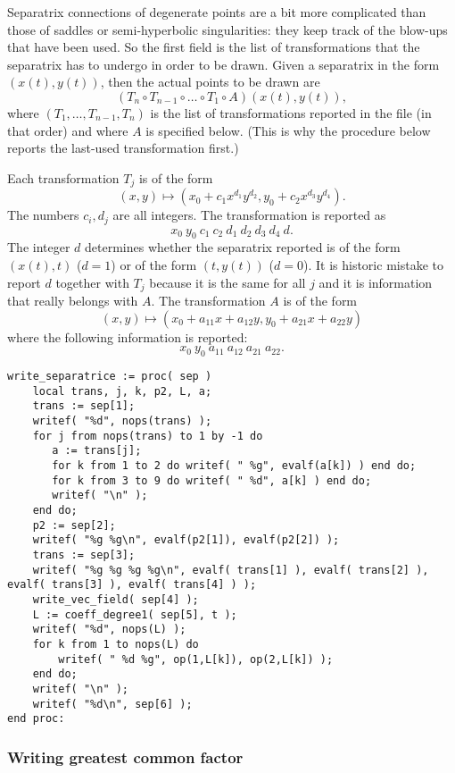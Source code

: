 \documentclass[a4paper,10pt]{article}
\begin{document}
Separatrix connections of degenerate points are a bit more complicated than those of saddles or semi-hyperbolic singularities: they keep track of the blow-ups that have been used.
So the first field is the list of transformations that the separatrix has to undergo in order to be drawn.  Given a separatrix in the form $(x(t),y(t))$, then the actual points to be drawn are
\[
    (T_{n}\circ T_{n-1}\circ\dots\circ T_1\circ A) (x(t),y(t)),
\]
where $(T_1,\dots,T_{n-1},T_n)$ is the list of transformations reported in the file (in that order) and where $A$ is specified below.  (This is why the procedure below reports the last-used transformation first.)

Each transformation $T_j$ is of the form
\[
    (x,y)\mapsto (x_0 + c_1x^{d_1}y^{d_2},y_0 + c_2x^{d_3}y^{d_4}).
\]
The numbers $c_i,d_j$ are all integers.  The transformation is reported as
\[
    x_0\: y_0\: c_1\: c_2\: d_1\: d_2\: d_3\: d_4\: d.
\]
The integer $d$ determines whether the separatrix reported is of the form $(x(t),t)$ ($d=1$) or of the form $(t,y(t))$ ($d=0$).  It is historic mistake to report $d$ together with $T_j$ because it is the same for all $j$ and it is information that really belongs with  $A$.  The transformation $A$ is of the form
\[
    (x,y) \mapsto (x_0 + a_{11}x + a_{12}y, y_0 + a_{21}x + a_{22}y)
\]
where the following information is reported:
\[
    x_0\: y_0\: a_{11}\: a_{12}\: a_{21}\: a_{22}.
\]


\begin{lstlisting}[name=writelog]
write_separatrice := proc( sep )
    local trans, j, k, p2, L, a;
    trans := sep[1];
    writef( "%d", nops(trans) );
    for j from nops(trans) to 1 by -1 do
       a := trans[j];
       for k from 1 to 2 do writef( " %g", evalf(a[k]) ) end do;
       for k from 3 to 9 do writef( " %d", a[k] ) end do;
       writef( "\n" );
    end do;
    p2 := sep[2];
    writef( "%g %g\n", evalf(p2[1]), evalf(p2[2]) );
    trans := sep[3];
    writef( "%g %g %g %g\n", evalf( trans[1] ), evalf( trans[2] ), evalf( trans[3] ), evalf( trans[4] ) );
    write_vec_field( sep[4] );
    L := coeff_degree1( sep[5], t );
    writef( "%d", nops(L) );
    for k from 1 to nops(L) do
        writef( " %d %g", op(1,L[k]), op(2,L[k]) );
    end do;
    writef( "\n" );
    writef( "%d\n", sep[6] );
end proc:
\end{lstlisting}

\subsubsection{Writing greatest common factor}
\end{document}
